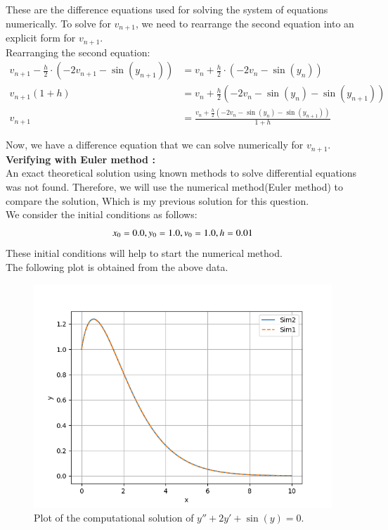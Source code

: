 \documentclass[journal]{IEEEtran}
\begin{document}
These are the difference equations used for solving the system of equations numerically. To solve for \( v_{n+1} \), we need to rearrange the second equation into an explicit form for \( v_{n+1} \).\\

Rearranging the second equation:
\begin{align}
    v_{n+1} - \frac{h}{2} \cdot (-2v_{n+1} - \sin(y_{n+1})) &= v_n + \frac{h}{2} \cdot (-2v_n - \sin(y_n)) \\
    v_{n+1} \left( 1 + h \right) &= v_n + \frac{h}{2} \left( -2v_n - \sin(y_n) - \sin(y_{n+1}) \right) \\
    v_{n+1} &= \frac{v_n + \frac{h}{2} \left( -2v_n - \sin(y_n) - \sin(y_{n+1}) \right)}{1 + h}
\end{align}

Now, we have a difference equation that we can solve numerically for \( v_{n+1} \).\\
\textbf{Verifying with Euler method :}\\
An exact theoretical solution using known methods to solve differential equations was not found. Therefore, we will use the numerical method(Euler method) to compare the solution, Which is my previous solution for this question.\\
We consider the initial conditions as follows:
$$
    \\x_0 = 0.0,\\y_0 = 1.0,\\v_0 = 1.0,\\ h = 0.01\\
$$
These initial conditions will help to start the numerical method.\\
The following plot is obtained from the above data.
\begin{figure}[h!]
   \centering
   \includegraphics[width=\columnwidth]{figs/12.9.1.10.png}
   \caption{Plot of the computational solution of $y'' + 2y' + \sin(y) = 0$.}
   \label{}
\end{figure}
\end{document}
